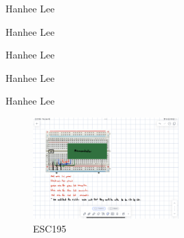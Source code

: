 \documentclass{article}
\begin{document}
\begin{definition}
    
\end{definition}

\begin{theorem}
    Hanhee Lee
\end{theorem}

\begin{derivation}
    Hanhee Lee
\end{derivation}

\begin{intuition}
    Hanhee Lee
\end{intuition}

\begin{warning}
    Hanhee Lee
\end{warning}

\begin{terminology}
    Hanhee Lee
\end{terminology}

\begin{figure}[H]
    \centering
    \includegraphics[width=0.5\textwidth]{00_Images/diagram_circuit.png}
    \caption{ESC195}
\end{figure}
\end{document}
